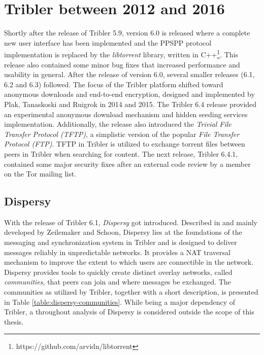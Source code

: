 \section{Tribler between 2012 and 2016}
Shortly after the release of Tribler 5.9, version 6.0 is released where a complete new user interface has been implemented and the PPSPP protocol implementation is replaced by the \emph{libtorrent} library, written in C++\footnote{https://github.com/arvidn/libtorrent}. This release also contained some minor bug fixes that increased performance and usability in general. After the release of version 6.0, several smaller releases (6.1, 6.2 and 6.3) followed. The focus of the Tribler platform shifted toward anonymous downloads and end-to-end encryption, designed and implemented by Plak, Tanaskoski and Ruigrok in 2014 and 2015\cite{plak2014anonymous}\cite{tanaskoski2014anonymous}\cite{ruigrok2015bittorrent}. The Tribler 6.4 release provided an experimental anonymous download mechanism and hidden seeding services implementation. Additionally, the release also introduced the \emph{Trivial File Transfer Protocol (TFTP)}, a simplistic version of the popular \emph{File Transfer Protocol (FTP)}. TFTP in Tribler is utilized to exchange torrent files between peers in Tribler when searching for content. The next release, Tribler 6.4.1, contained some major security fixes after an external code review by a member on the Tor mailing list\cite{githubissue1066}.

\subsection{Dispersy}
With the release of Tribler 6.1, \emph{Dispersy} got introduced. Described in \cite{zeilemaker2013dispersy} and mainly developed by Zeilemaker and Schoon, Dispersy lies at the foundations of the messaging and synchronization system in Tribler and is designed to deliver messages reliably in unpredictable networks. It provides a NAT traversal mechanism to improve the extent to which users are connectible in the network. Dispersy provides tools to quickly create distinct overlay networks, called \emph{communities}, that peers can join and where messages be exchanged. The communities as utilized by Tribler, together with a short description, is presented in Table \ref{table:dispersy-communities}. While being a major dependency of Tribler, a throughout analysis of Dispersy is considered outside the scope of this thesis.

